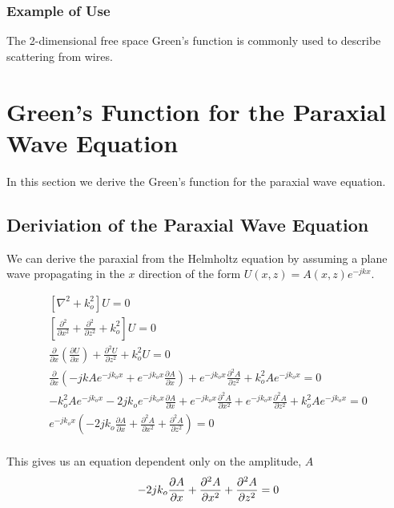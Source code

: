 \subsubsection{Example of Use}
The 2-dimensional free space Green's function is commonly used to describe scattering from wires.

\section{Green's Function for the Paraxial Wave Equation}
In this section we derive the Green's function for the paraxial wave equation.

\subsection{Deriviation of the Paraxial Wave Equation}
We can derive the paraxial from the Helmholtz equation by assuming a plane wave propagating in the $x$ direction of the form $U(x,z) = A(x,z)e^{-jkx}$.

 \begin{equation}
 \begin{gathered}
 \left[ \nabla^2 + k_o^2\right]U = 0 \\
\left[\frac{\partial^2 }{\partial x^2} + \frac{\partial^2 }{\partial z^2} + k_o^2\right]U = 0 \\
\frac{\partial }{\partial x}\left(\frac{\partial U}{\partial x} \right) + \frac{\partial^2 U}{\partial z^2} + k_o^2 U = 0 \\
\frac{\partial }{\partial x}\left(-jkAe^{-jk_ox}+e^{-jk_ox}\frac{\partial A}{\partial x} \right) + e^{-jk_ox}\frac{\partial^2 A}{\partial z^2} + k_o^2 Ae^{-jk_ox} = 0 \\
-k_o^2Ae^{-jk_ox} -2jk_oe^{-jk_ox}\frac{\partial A}{\partial x}+e^{-jk_ox}\frac{\partial^2 A}{\partial x^2} + e^{-jk_ox}\frac{\partial^2 A}{\partial z^2} + k_o^2 Ae^{-jk_ox} = 0 \\
e^{-jk_ox}\left( -2jk_o\frac{\partial A}{\partial x}+\frac{\partial^2 A}{\partial x^2} + \frac{\partial^2 A}{\partial z^2}\right) = 0 \\
\end{gathered}
\label{gf_eq:41}
\end{equation}
 \renewcommand{\baselinestretch}{2} \small\normalsize
 
This gives us an equation dependent only on the amplitude, $A$
 \begin{equation}
-2jk_o\frac{\partial A}{\partial x}+\frac{\partial^2 A}{\partial x^2} + \frac{\partial^2 A}{\partial z^2} = 0 \\
\label{gf_eq:42}
\end{equation}
 \renewcommand{\baselinestretch}{2} \small\normalsize
 
